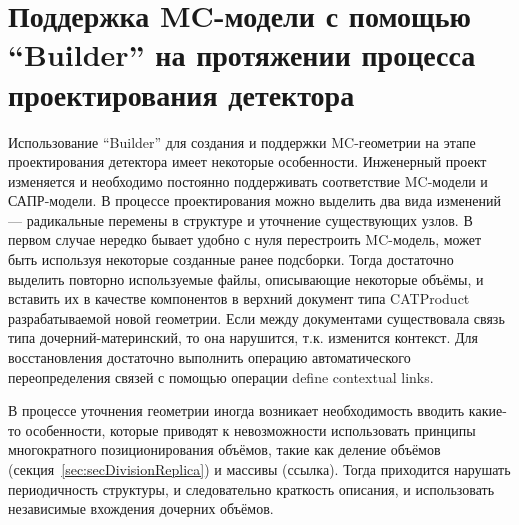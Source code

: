 
\section{Поддержка MC-модели с помощью ``Builder'' на протяжении процесса проектирования детектора}\label{sec:DesignProcess}

Использование ``Builder'' для создания и поддержки MC-геометрии на этапе проектирования детектора имеет некоторые особенности. Инженерный проект изменяется и необходимо постоянно поддерживать соответствие MC-модели и САПР-модели. В процессе проектирования можно выделить два вида изменений --- радикальные перемены в структуре и уточнение существующих узлов. В первом случае нередко бывает удобно с нуля перестроить MC-модель, может быть используя некоторые созданные ранее подсборки. Тогда достаточно выделить повторно используемые файлы, описывающие некоторые объёмы, и вставить их в качестве компонентов в верхний документ типа CATProduct разрабатываемой новой геометрии. Если между документами существовала связь типа дочерний-материнский, то она нарушится, т.к. изменится контекст. Для восстановления достаточно выполнить операцию автоматического переопределения связей с помощью операции define contextual links.

В процессе уточнения геометрии иногда возникает необходимость вводить какие-то особенности, которые приводят к невозможности использовать принципы многократного позиционирования объёмов, такие как деление объёмов (секция~\ref{sec:secDivisionReplica}) и массивы (\todo ссылка). Тогда приходится нарушать периодичность структуры, и следовательно краткость описания, и использовать независимые вхождения дочерних объёмов. 


